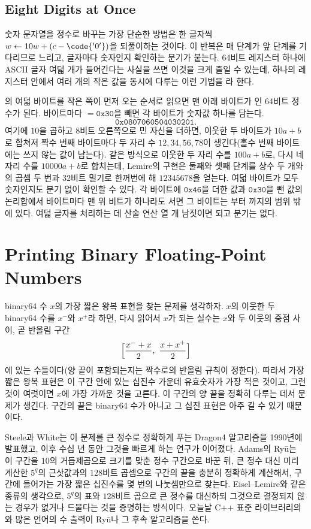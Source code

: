 \subsection{Eight Digits at Once}

숫자 문자열을 정수로 바꾸는 가장 단순한 방법은 한 글자씩 $w\gets10w+(c-\code{'0'})$을 되풀이하는 것이다. 이 반복은 매 단계가 앞 단계를 기다리므로 느리고, 글자마다 숫자인지 확인하는 분기가 붙는다. 64비트 레지스터 하나에 ASCII 글자 여덟 개가 들어간다는 사실을 쓰면 이것을 크게 줄일 수 있는데, 하나의 레지스터 안에서 여러 개의 작은 값을 동시에 다루는 이런 기법을 라 한다.

의 여덟 바이트를 작은 쪽이 먼저 오는 순서로 읽으면 맨 아래 바이트가 인 64비트 정수가 된다. 바이트마다 $=\mathtt{0x30}$을 빼면 각 바이트가 숫자값 하나를 담는다.
\[
\mathtt{0x0807060504030201}.
\]
여기에 $10$을 곱하고 $8$비트 오른쪽으로 민 자신을 더하면, 이웃한 두 바이트가 $10a+b$로 합쳐져 짝수 번째 바이트마다 두 자리 수 $12,34,56,78$이 생긴다(홀수 번째 바이트에는 쓰지 않는 값이 남는다). 같은 방식으로 이웃한 두 자리 수를 $100a+b$로, 다시 네 자리 수를 $10000a+b$로 합치는데, Lemire의 구현은 둘째와 셋째 단계를 상수 두 개와의 곱셈 두 번과 $32$비트 밀기로 한꺼번에 해 $12345678$을 얻는다. 여덟 바이트가 모두 숫자인지도 분기 없이 확인할 수 있다. 각 바이트에 $\mathtt{0x46}$을 더한 값과 $\mathtt{0x30}$을 뺀 값의 논리합에서 바이트마다 맨 위 비트가 하나라도 서면 그 바이트는 부터 까지의 범위 밖에 있다. 여덟 글자를 처리하는 데 산술 연산 열 개 남짓이면 되고 분기는 없다.

\section{Printing Binary Floating-Point Numbers}
\label{sec:printing}

binary64 수 $x$의 가장 짧은 왕복 표현을 찾는 문제를 생각하자. $x$의 이웃한 두 binary64 수를 $x^-$와 $x^+$라 하면, 다시 읽어서 $x$가 되는 실수는 $x$와 두 이웃의 중점 사이, 곧 반올림 구간
\[
\Bigl[\frac{x^-+x}2,\ \frac{x+x^+}2\Bigr]
\]
에 있는 수들이다(양 끝이 포함되는지는 짝수로의 반올림 규칙이 정한다). 따라서 가장 짧은 왕복 표현은 이 구간 안에 있는 십진수 가운데 유효숫자가 가장 적은 것이고, 그런 것이 여럿이면 $x$에 가장 가까운 것을 고른다. 이 구간의 양 끝을 정확히 다루는 데서 문제가 생긴다. 구간의 끝은 binary64 수가 아니고 그 십진 표현은 아주 길 수 있기 때문이다.

Steele과 White는 이 문제를 큰 정수로 정확하게 푸는 Dragon4 알고리즘을 1990년에 발표했고\cite{steele1990}, 이후 수십 년 동안 그것을 빠르게 하는 연구가 이어졌다. Adams의 Ryū는 이 구간을 $10$의 거듭제곱으로 크기를 맞춘 정수 구간으로 바꾼 뒤, 큰 정수 대신 미리 계산한 $5^q$의 근삿값과의 $128$비트 곱셈으로 구간의 끝을 충분히 정확하게 계산해서, 구간에 들어가는 가장 짧은 십진수를 몇 번의 나눗셈만으로 찾는다\cite{adams2018ryu}. Eisel--Lemire와 같은 종류의 생각으로, $5^q$의 표와 $128$비트 곱으로 큰 정수를 대신하되 그것으로 결정되지 않는 경우가 없거나 드물다는 것을 증명하는 방식이다. 오늘날 C++ 표준 라이브러리의 와 많은 언어의 수 출력이 Ryū나 그 후속 알고리즘을 쓴다.

